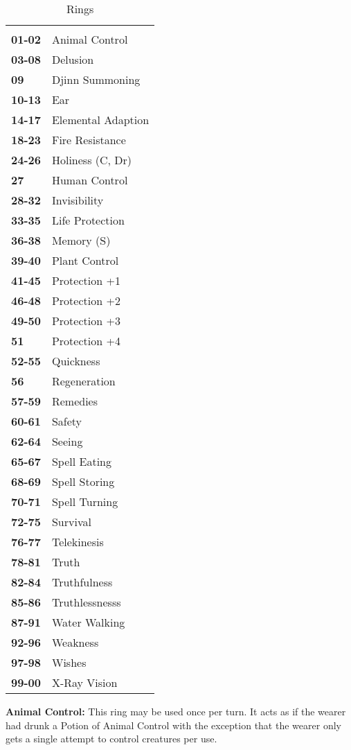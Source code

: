 \begin{multicols*}{2}
\begin {table}[H]
  \caption{Rings}
  \begin{tabularx}{\columnwidth}{>{\bfseries}YY}
	 & \\
	01-02 & Animal Control\\
	03-08 & Delusion\\
	09 & Djinn Summoning\\
	10-13 & Ear\\
	14-17 & Elemental Adaption\\
	18-23 & Fire Resistance\\
	24-26 & Holiness (C, Dr)\\
	27 & Human Control\\
	28-32 & Invisibility\\
	33-35 & Life Protection\\
	36-38 & Memory (S)\\
	39-40 & Plant Control\\
	41-45 & Protection +1\\
	46-48 & Protection +2\\
	49-50 & Protection +3\\
	51 & Protection +4\\
	52-55 & Quickness\\
	56 & Regeneration\\
	57-59 & Remedies\\
	60-61 & Safety\\
	62-64 & Seeing\\
	65-67 & Spell Eating\\
	68-69 & Spell Storing\\
	70-71 & Spell Turning\\
	72-75 & Survival\\
	76-77 & Telekinesis\\
	78-81 & Truth\\
	82-84 & Truthfulness\\
	85-86 & Truthlessnesss\\
	87-91 & Water Walking\\
	92-96 & Weakness\\
	97-98 & Wishes\\
	99-00 & X-Ray Vision
  \end {tabularx}
\end {table}

\textbf{Animal Control:} This ring may be used once per turn. It acts as if the wearer had drunk a Potion of Animal Control with the exception that the wearer only gets a single attempt to control creatures per use.


\end{multicols*}
